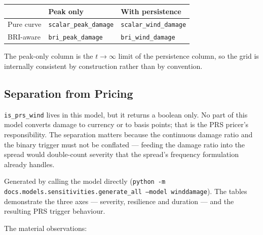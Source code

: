 \documentclass[11pt,a4paper]{article}
\begin{document}
\begin{table}[H]
  \centering
  \begin{tabular}{lll}
    \toprule
    & \textbf{Peak only} & \textbf{With persistence} \\
    \midrule
    Pure curve & \texttt{scalar\_peak\_damage} & \texttt{scalar\_wind\_damage} \\
    BRI-aware  & \texttt{bri\_peak\_damage}    & \texttt{bri\_wind\_damage} \\
    \bottomrule
  \end{tabular}
\end{table}

The peak-only column is the $t \to \infty$ limit of the persistence column, so
the grid is internally consistent by construction rather than by convention.

\subsection{Separation from Pricing}
\texttt{is\_prs\_wind} lives in this model, but it returns a boolean only. No
part of this model converts damage to currency or to basis points; that is the
PRS pricer's responsibility. The separation matters because the continuous
damage ratio and the binary trigger must not be conflated --- feeding the
damage ratio into the spread would double-count severity that the spread's
frequency formulation already handles.

\mkmsensitivity
\label{sec:sensitivity}

Generated by calling the model directly
(\texttt{python -m docs.models.sensitivities.generate\_all --model winddamage}).
The tables demonstrate the three axes --- severity, resilience and duration ---
and the resulting PRS trigger behaviour.

The material observations:
\end{document}
